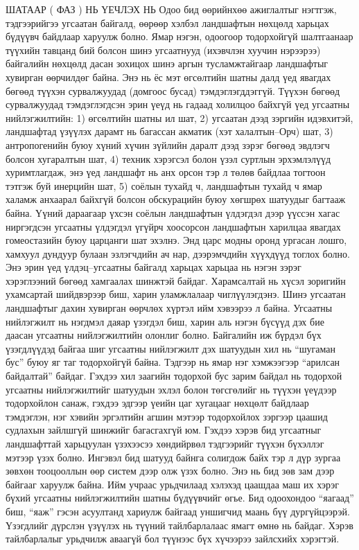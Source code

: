 ШАТААР ( ФАЗ ) НЬ ҮЕЧЛЭХ НЬ
Одоо бид өөрийнхөө ажиглалтыг нэгтгэж, тэдгээрийгээ угсаатан байгалд, өөрөөр хэлбэл ландшафтын нөхцөлд харьцах бүдүүвч байдлаар харуулж болно. Ямар нэгэн, одоогоор тодорхойгүй шалтгаанаар түүхийн тавцанд бий болсон шинэ угсаатнууд (ихэвчлэн хуучин нэрээрээ) байгалийн нөхцөлд дасан зохицох шинэ аргын тусламжтайгаар ландшафтыг хувирган өөрчилдөг байна. Энэ нь ёс мэт өгсөлтийн шатны далд үед явагдах бөгөөд түүхэн сурвалжуудад (домгоос бусад) тэмдэглэгддэггүй. Түүхэн бөгөөд сурвалжуудад тэмдэглэгдсэн эрин үеүд нь гадаад холилцоо байхгүй үед угсаатны нийлэгжилтийн: 1) өгсөлтийн шатны ил шат, 2) угсаатан дээд зэргийн идэвхитэй, ландшафтад үзүүлэх дарамт нь багассан акматик (хэт халалтын–Орч) шат, 3) антропогенийн буюу хүний хүчин зүйлийн даралт дээд зэрэг бөгөөд эвдлэгч болсон хугаралтын шат, 4) техник хэрэгсэл болон үзэл суртлын эрхэмлэлүүд хуримтлагдаж, энэ үед ландшафт нь анх орсон тэр л төлөв байдлаа тогтоон тэтгэж буй инерцийн шат, 5) соёлын тухайд ч, ландшафтын тухайд ч ямар халамж анхаарал байхгүй болсон обскурацийн буюу хөгшрөх шатуудыг багтааж байна. Үүний дараагаар үхсэн соёлын ландшафтын үлдэгдэл дээр үүссэн хагас ниргэгдсэн угсаатны үлдэгдэл үгүйрч хоосорсон ландшафтын харилцаа явагдах гомеостазийн буюу царцанги шат эхэлнэ. Энд царс модны оронд ургасан лошго, хамхуул дундуур булаан эзлэгчдийн ач нар, дээрэмчдийн хүүхдүүд тоглох болно.
Энэ эрин үед үлдэц–угсаатны байгалд харьцах харьцаа нь нэгэн зэрэг хэрэглээний бөгөөд хамгаалах шинжтэй байдаг. Харамсалтай нь хүсэл зоригийн ухамсартай шийдвэрээр биш, харин уламжлалаар чиглүүлэгдэнэ. Шинэ угсаатан ландшафтыг дахин хувирган өөрчлөх хүртэл ийм хэвээрээ л байна. Угсаатны нийлэгжилт нь нэгдмэл даяар үзэгдэл биш, харин аль нэгэн бүсүүд дэх бие даасан угсаатны нийлэгжилтийн олонлиг болно.
Байгалийн иж бүрдэл бүх үзэгдлүүдэд байгаа шиг угсаатны нийлэгжилт дэх шатуудын хил нь “шугаман бус” буюу яг таг тодорхойгүй байна. Тэдгээр нь ямар нэг хэмжээгээр “арилсан байдалтай” байдаг. Гэхдээ хил заагийн тодорхой бус зарим байдал нь тодорхой угсаатны нийлэгжилтийг шатуудын эхлэл болон төгсгөлийг нь түүхэн үеүдээр тодорхойлон санаж, гэхдээ эдгээр үеийн цаг хугацааг нөхцөлт байдлаар тэмдэглэн, нэг хэвийн эргэлтийн агшин мэтээр тодорхойлох зэргээр цаашид судлахын зайлшгүй шинжийг багасгахгүй юм.
Гэхдээ хэрэв бид угсаатныг ландшафттай харьцуулан үзэхээсээ хөндийрвөл тэдгээрийг түүхэн бүхэллэг мэтээр үзэх болно. Ингэвэл бид шатууд байнга солигдож байх тэр л дүр зургаа зөвхөн тооцооллын өөр систем дээр олж үзэх болно. Энэ нь бид зөв зам дээр байгааг харуулж байна. Ийм учраас урьдчилаад хэлэхэд цаашдаа маш их хэрэг бүхий угсаатны нийлэгжилтийн шатны бүдүүвчийг өгье. Бид одоохондоо “яагаад” биш, “яаж” гэсэн асуултанд хариулж байгаад уншигчид маань бүү дургүйцээрэй. Үзэгдлийг дүрслэн үзүүлэх нь түүний тайлбарлалаас ямагт өмнө нь байдаг. Хэрэв тайлбарлалыг урьдчилж аваагүй бол түүнээс бүх хүчээрээ зайлсхийх хэрэгтэй.
